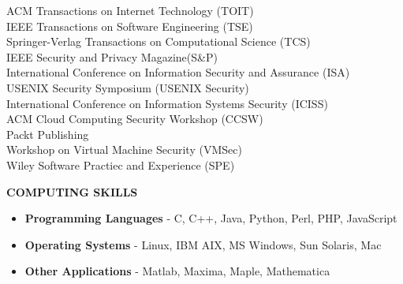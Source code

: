\documentclass[10pt]{article}
\begin{document}
\begin{itemize}
    ACM Transactions on Internet Technology (TOIT)\\
    IEEE Transactions on Software Engineering (TSE)\\
    Springer-Verlag Transactions on Computational Science (TCS)\\
    IEEE Security and Privacy Magazine(S\&P)\\
    International Conference on Information Security and Assurance (ISA)\\
    USENIX Security Symposium (USENIX Security)\\
    International Conference on Information Systems Security (ICISS)\\
    ACM Cloud Computing Security Workshop (CCSW)\\
    Packt Publishing\\
    Workshop on Virtual Machine Security (VMSec)\\
    Wiley Software Practiec and Experience (SPE)

\end{itemize}

\vspace{1em} {\Large \textbf{COMPUTING SKILLS}}
\begin{itemize}
\item \textbf{Programming Languages} - C, C++, Java, Python, Perl, PHP, JavaScript
\item \textbf{Operating Systems} - Linux, IBM AIX, MS Windows, Sun Solaris, Mac
\item \textbf{Other Applications} - Matlab, Maxima, Maple, Mathematica

\end{itemize}
\end{document}
